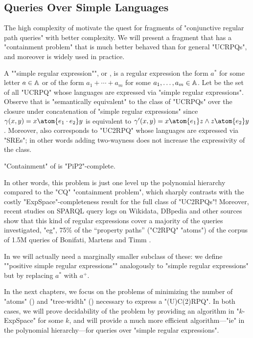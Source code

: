 \subsection{Queries Over Simple Languages}

The high complexity of  motivate
the quest for fragments of "conjunctive regular path queries" with better complexity.
We will present a fragment {\UCRPQSRE} that
has a "containment problem" that is much better behaved than for general "UCRPQs",
and moreover is widely used in practice.

\AP A ""simple regular expression"", or , is a regular expression the form $a^*$ for some letter $a \in \mathbb{A}$ or of the form $a_1 + \dotsb + a_m$ for some $a_1, \dotsc, a_m \in \mathbb{A}$. 
\AP Let \intro*{\UCRPQSRE} be the set of all "UCRPQ" whose languages are expressed via "simple regular expressions". Observe that {\UCRPQSRE} is "semantically equivalent" to the class of "UCRPQs" over the closure under concatenation of "simple regular expressions"
since $\gamma(x,y) = x \atom{e_1 \cdot e_2} y$ is equivalent to $\gamma'(x,y) = x \atom{e_1} z \land  z \atom{e_2} y$.
Moreover, \UCRPQSRE{} also corresponds to "UC2RPQ" whose languages are expressed via "SREs";
in other words adding two-wayness does not increase the expressivity of the class. 

\begin{proposition}
    "Containment" of {\UCRPQSRE} is "PiP2"-complete.
\end{proposition}

In other words, this problem is just one level up the polynomial hierarchy compared to the "CQ" "containment problem", which sharply contrasts with the costly "ExpSpace"-completeness result
for the full class of "UC2RPQs"!
Moreover, recent studies on SPARQL query logs on Wikidata, DBpedia and other sources show that this kind of regular expressions cover a majority of the queries investigated, "eg", 75\% of
the ``property paths'' ("C2RPQ" "atoms") of the corpus of 1.5M queries of Bonifati, Martens and Timm \cite[Table 15]{BonifatiMartensTimm2020SPARQL}.

In  we will actually need a marginally smaller subclass of these:
we define \AP""positive simple regular expressions"" analogously to
"simple regular expressions" but by replacing $a^*$ with $a^+$.

In the next chapters,
we focus on the problems of minimizing the number of "atoms"
() and "tree-width" ()
necessary to express a "(U)C(2)RPQ". In both cases,
we will prove decidability of the problem by providing an algorithm in
"$k$-ExpSpace" for some $k$, and will provide a much more efficient algorithm---"ie" in the
polynomial hierarchy---for queries over "simple regular expressions".


